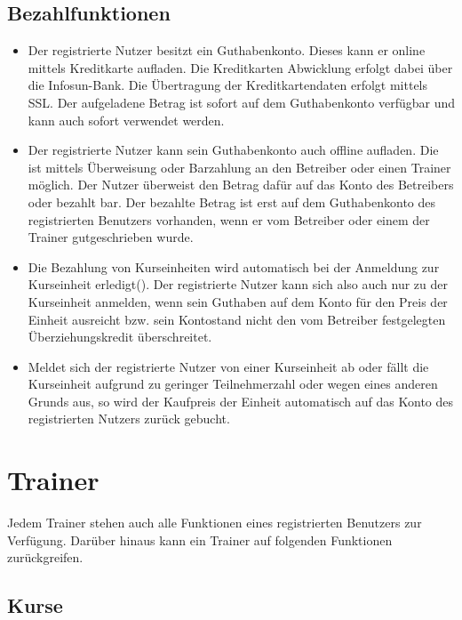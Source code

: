 \documentclass[a4paper]{scrreprt}
\newcounter{Lc}
\newcounter{Hc}
\newcommand{\stepHc}{\stepcounter{Hc}\setcounter{Lc}{0}}
\begin{document}
\subsection{Bezahlfunktionen}
\begin{itemize}
	\item {}
	Der registrierte Nutzer besitzt ein Guthabenkonto. Dieses kann er online mittels Kreditkarte aufladen. Die Kreditkarten Abwicklung erfolgt dabei
	über die Infosun-Bank. Die Übertragung der Kreditkartendaten erfolgt mittels SSL. Der aufgeladene Betrag ist sofort auf dem Guthabenkonto verfügbar und kann auch sofort verwendet werden.
	\item {}
	Der registrierte Nutzer kann sein Guthabenkonto auch offline aufladen. Die ist mittels Überweisung oder Barzahlung an den Betreiber oder einen Trainer möglich. 
	Der Nutzer überweist den Betrag dafür auf das Konto des Betreibers oder bezahlt bar. Der bezahlte Betrag ist erst auf dem Guthabenkonto des registrierten Benutzers vorhanden, wenn er vom Betreiber oder einem der Trainer gutgeschrieben wurde.
	\item {}
	Die Bezahlung von Kurseinheiten wird automatisch bei der Anmeldung zur Kurseinheit erledigt(). Der registrierte Nutzer kann sich also auch nur zu der Kurseinheit anmelden, wenn sein Guthaben auf dem Konto für den Preis der Einheit ausreicht bzw. sein Kontostand nicht den vom Betreiber festgelegten Überziehungskredit überschreitet.
	\item {}
	Meldet sich der registrierte Nutzer von einer Kurseinheit ab oder fällt die Kurseinheit aufgrund zu geringer Teilnehmerzahl oder wegen eines anderen Grunds aus, so wird der Kaufpreis der Einheit automatisch auf das Konto des registrierten Nutzers zurück gebucht.
\end{itemize}	

\section{Trainer}
Jedem Trainer stehen auch alle Funktionen eines registrierten Benutzers zur Verfügung. Darüber hinaus kann ein Trainer auf folgenden Funktionen zurückgreifen.
\stepHc
\subsection{Kurse}
\end{document}
